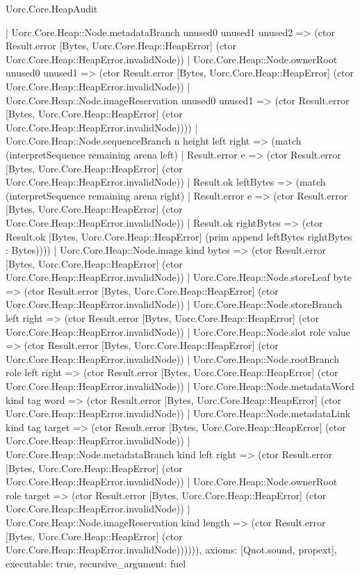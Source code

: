 \begin{lexlean}{Uorc.Core.HeapAudit}
\begin{semanticmodule}
{            | Uorc.Core.Heap::Node.metadataBranch unused0 unused1 unused2 => (ctor Result.error [Bytes, Uorc.Core.Heap::HeapError] (ctor Uorc.Core.Heap::HeapError.invalidNode))
            | Uorc.Core.Heap::Node.ownerRoot unused0 unused1 => (ctor Result.error [Bytes, Uorc.Core.Heap::HeapError] (ctor Uorc.Core.Heap::HeapError.invalidNode))
            | Uorc.Core.Heap::Node.imageReservation unused0 unused1 => (ctor Result.error [Bytes, Uorc.Core.Heap::HeapError] (ctor Uorc.Core.Heap::HeapError.invalidNode))))
        | Uorc.Core.Heap::Node.sequenceBranch n height left right => (match (interpretSequence remaining arena left)
          | Result.error e => (ctor Result.error [Bytes, Uorc.Core.Heap::HeapError] (ctor Uorc.Core.Heap::HeapError.invalidNode))
          | Result.ok leftBytes => (match (interpretSequence remaining arena right)
            | Result.error e => (ctor Result.error [Bytes, Uorc.Core.Heap::HeapError] (ctor Uorc.Core.Heap::HeapError.invalidNode))
            | Result.ok rightBytes => (ctor Result.ok [Bytes, Uorc.Core.Heap::HeapError] (prim append leftBytes rightBytes : Bytes))))
        | Uorc.Core.Heap::Node.image kind bytes => (ctor Result.error [Bytes, Uorc.Core.Heap::HeapError] (ctor Uorc.Core.Heap::HeapError.invalidNode))
        | Uorc.Core.Heap::Node.storeLeaf byte => (ctor Result.error [Bytes, Uorc.Core.Heap::HeapError] (ctor Uorc.Core.Heap::HeapError.invalidNode))
        | Uorc.Core.Heap::Node.storeBranch left right => (ctor Result.error [Bytes, Uorc.Core.Heap::HeapError] (ctor Uorc.Core.Heap::HeapError.invalidNode))
        | Uorc.Core.Heap::Node.slot role value => (ctor Result.error [Bytes, Uorc.Core.Heap::HeapError] (ctor Uorc.Core.Heap::HeapError.invalidNode))
        | Uorc.Core.Heap::Node.rootBranch role left right => (ctor Result.error [Bytes, Uorc.Core.Heap::HeapError] (ctor Uorc.Core.Heap::HeapError.invalidNode))
        | Uorc.Core.Heap::Node.metadataWord kind tag word => (ctor Result.error [Bytes, Uorc.Core.Heap::HeapError] (ctor Uorc.Core.Heap::HeapError.invalidNode))
        | Uorc.Core.Heap::Node.metadataLink kind tag target => (ctor Result.error [Bytes, Uorc.Core.Heap::HeapError] (ctor Uorc.Core.Heap::HeapError.invalidNode))
        | Uorc.Core.Heap::Node.metadataBranch kind left right => (ctor Result.error [Bytes, Uorc.Core.Heap::HeapError] (ctor Uorc.Core.Heap::HeapError.invalidNode))
        | Uorc.Core.Heap::Node.ownerRoot role target => (ctor Result.error [Bytes, Uorc.Core.Heap::HeapError] (ctor Uorc.Core.Heap::HeapError.invalidNode))
        | Uorc.Core.Heap::Node.imageReservation kind length => (ctor Result.error [Bytes, Uorc.Core.Heap::HeapError] (ctor Uorc.Core.Heap::HeapError.invalidNode)))))),
  axioms: [Quot.sound, propext],
  executable: true,
  recursive_argument: fuel
}


\end{semanticmodule}
\end{lexlean}
